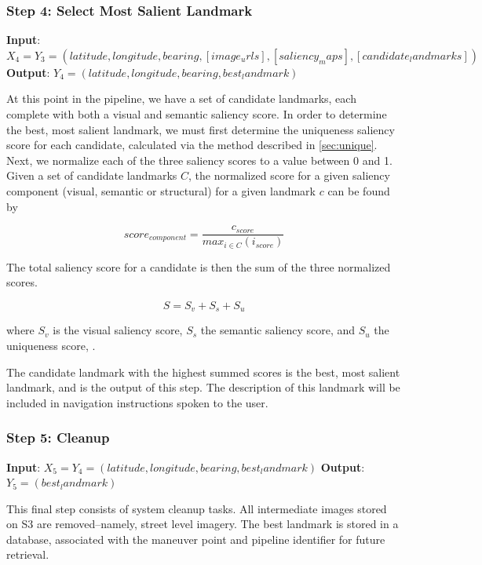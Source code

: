 \subsubsection*{Step 4: Select Most Salient Landmark}

\textbf{Input}: $X_4 = Y_3 = (latitude, longitude, bearing,  [image_urls], [saliency_maps], [candidate_landmarks] )$
\textbf{Output}: $Y_4 = (latitude, longitude, bearing, best_landmark)$ 

At this point in the pipeline, we have a set of candidate landmarks, each complete with both a visual and semantic saliency score. In order to determine the best, most salient landmark, we must first determine the uniqueness saliency score for each candidate, calculated via the method described in \ref{sec:unique}. Next, we normalize each of the three saliency scores to a value between 0 and 1. Given a set of candidate landmarks $C$, the normalized score for a given saliency component (visual, semantic or structural) for a given landmark $c$ can be found by

\begin{equation}
    score_{component} = \frac{c_{score}}{max_{i \in C}(i_{score})}
\end{equation}

The total saliency score for a candidate is then the sum of the three normalized scores. 

\begin{equation}\label{eq:saliency}
    S = S_v + S_s + S_u
\end{equation}

where $S_v$ is the visual saliency score, $S_s$ the semantic saliency score, and $S_u$ the uniqueness score, .

The candidate landmark with the highest summed scores is the best, most salient landmark, and is the output of this step. The description of this landmark will be included in navigation instructions spoken to the user.

\subsubsection*{Step 5: Cleanup}

\textbf{Input}: $X_5 = Y_4 = (latitude, longitude, bearing, best_landmark)$
\textbf{Output}: $Y_5 = (best_landmark)$

This final step consists of system cleanup tasks. All intermediate images stored on S3 are removed--namely, street level imagery. The best landmark is stored in a database, associated with the maneuver point and pipeline identifier for future retrieval.

